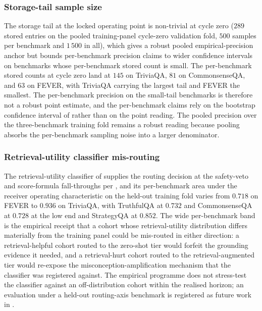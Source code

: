 \subsubsection{Storage-tail sample size}
\label{sec:disc-threat-n}

The storage tail at the locked operating point is non-trivial at cycle zero ($289$ stored entries on the pooled training-panel cycle-zero validation fold, $500$ samples per benchmark and $1\,500$ in all), which gives a robust pooled empirical-precision anchor but bounds per-benchmark precision claims to wider confidence intervals on benchmarks whose per-benchmark stored count is small. The per-benchmark stored counts at cycle zero land at $145$ on TriviaQA, $81$ on CommonsenseQA, and $63$ on FEVER, with TriviaQA carrying the largest tail and FEVER the smallest. The per-benchmark precision on the small-tail benchmarks is therefore not a robust point estimate, and the per-benchmark claims rely on the bootstrap confidence interval of  rather than on the point reading. The pooled precision over the three-benchmark training fold remains a robust reading because pooling absorbs the per-benchmark sampling noise into a larger denominator.

\subsubsection{Retrieval-utility classifier mis-routing}
\label{sec:disc-threat-ruc}

The retrieval-utility classifier of  supplies the routing decision at the safety-veto and score-formula fall-throughs per , and its per-benchmark area under the receiver operating characteristic on the held-out training fold varies from $0.718$ on FEVER to $0.936$ on TriviaQA, with TruthfulQA at $0.732$ and CommonsenseQA at $0.728$ at the low end and StrategyQA at $0.852$. The wide per-benchmark band is the empirical receipt that a cohort whose retrieval-utility distribution differs materially from the training panel could be mis-routed in either direction: a retrieval-helpful cohort routed to the zero-shot tier would forfeit the grounding evidence it needed, and a retrieval-hurt cohort routed to the retrieval-augmented tier would re-expose the misconception-amplification mechanism that the classifier was registered against. The empirical programme does not stress-test the classifier against an off-distribution cohort within the realised horizon; an evaluation under a held-out routing-axis benchmark is registered as future work in .

